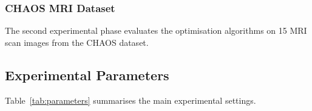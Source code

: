 \documentclass[review]{elsarticle}
\begin{document}


\subsubsection{CHAOS MRI Dataset}

The second experimental phase evaluates the optimisation algorithms on
15 MRI scan images from the CHAOS dataset.



\subsection{Experimental Parameters}

Table~\ref{tab:parameters} summarises the main experimental settings.
\end{document}
